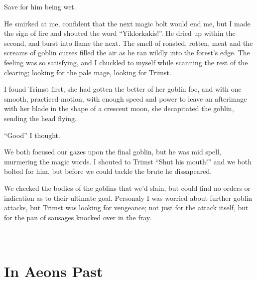 \documentclass[12pt, a4paper]{book}
\begin{document}
Save for him being wet. 

He smirked at me, confident that the next magic bolt would end me, but I made the sign of fire and shouted the word ``Yiklorkakis!''. He dried up within the second, and burst into flame the next. The smell of roasted, rotten, meat and the screams of goblin curses filled the air as he ran wildly into the forest's edge. The feeling was so satisfying, and I chuckled to myself while scanning the rest of the clearing; looking for the pale mage, looking for Trimst.

I found Trimst first, she had gotten the better of her goblin foe, and with one smooth, practiced motion, with enough speed and power to leave an afterimage with her blade in the shape of a crescent moon, she decapitated the goblin, sending the head flying.

``Good'' I thought.

We both focused our gazes upon the final goblin, but he was mid spell, murmering the magic words. I shouted to Trimst ``Shut his mouth!'' and we both bolted for him, but before we could tackle the brute he dissapeared. 

We checked the bodies of the goblins that we'd slain, but could find no orders or indication as to their ultimate goal. Personaly I was worried about further goblin attacks, but Trimst was looking for vengeance; not just for the attack itself, but for the pan of sausages knocked over in the fray.

\part*{
\setlength{\fboxsep}{3pt}%
\setlength{\fboxrule}{3pt}%
~\\[1cm]
In Aeons Past
}
\setcounter{chapter}{0}
\end{document}
